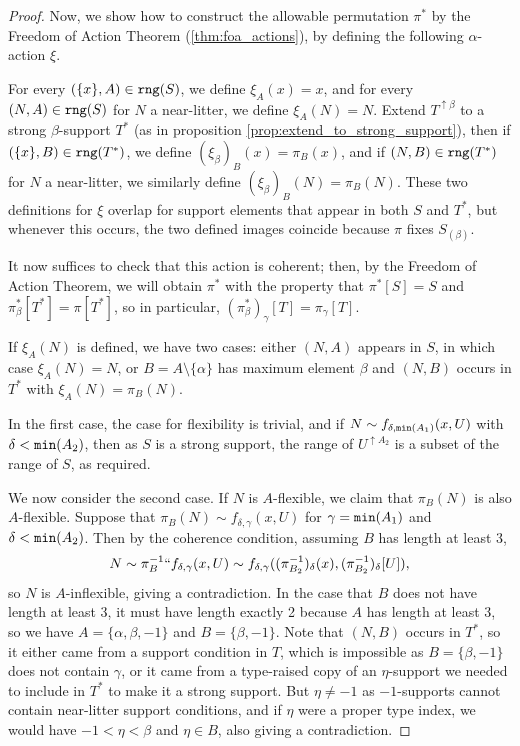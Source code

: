 \documentclass{article}
\theoremstyle{definition}
\theoremstyle{remark}
\begin{document}
{\begin{proof}
Now, we show how to construct the allowable permutation $\pi^*$ by the Freedom of Action Theorem (\ref{thm:foa_actions}), by defining the following $\alpha$-action $\xi$.

For every $(\{x\},A) \in {\tt rng}(S)$, we define $\xi_A(x) = x$, and for every $(N,A) \in {\tt rng}(S)$ for $N$ a near-litter, we define $\xi_A(N) = N$.
Extend $T^{\uparrow\beta}$ to a strong $\beta$-support $T^*$ {(as in proposition \ref{prop:extend_to_strong_support})}, then if $(\{x\},B) \in {\tt rng}(T^*)$, we define $(\xi_\beta)_B(x) = \pi_B(x)$, and if $(N,B) \in {\tt rng}(T^*)$ for $N$ a near-litter, we similarly define $(\xi_\beta)_B(N) = \pi_B(N)$.
These two definitions for $\xi$ overlap for support elements that appear in both $S$ and $T^*$, but whenever this occurs, the two defined images coincide because $\pi$ fixes $S_{(\beta)}$.

It now suffices to check that this action is coherent; then, by the Freedom of Action Theorem, we will obtain $\pi^*$ with the property that $\pi^*[S] = S$ and $\pi^*_\beta[T^*] = \pi[T^*]$, so in particular, $(\pi^*_\beta)_\gamma[T] = \pi_\gamma[T]$.

If $\xi_A(N)$ is defined, we have two cases: either $(N,A)$ appears in $S$, in which case $\xi_A(N) = N$, or $B = A\setminus\{\alpha\}$ has maximum element $\beta$ and $(N,B)$ occurs in $T^*$ with $\xi_A(N) = \pi_B(N)$.

In the first case, the case for flexibility is trivial, and if $N \sim f_{\delta,{\tt min}(A_1)}(x,U)$ with $\delta < {\tt min}(A_2)$, then as $S$ is a strong support, the range of $U^{\uparrow A_2}$ is a subset of the range of $S$, as required.

We now consider the second case.
If $N$ is $A$-flexible, we claim that $\pi_B(N)$ is also $A$-flexible.
Suppose that $\pi_B(N) \sim f_{\delta,\gamma}(x, U)$ for $\gamma = {\tt min}(A_1)$ and $\delta < {\tt min}(A_2)$.
Then by the coherence condition, assuming $B$ has length at least 3,
$$ N \sim \pi_B^{-1}``f_{\delta,\gamma}(x, U) \sim f_{\delta,\gamma}((\pi_{B_2}^{-1})_\delta(x), (\pi_{B_2}^{-1})_\delta[U]), $$
so $N$ is $A$-inflexible, giving a contradiction.
In the case that $B$ does not have length at least 3, it must have length exactly 2 because $A$ has length at least 3, so we have $A = \{ \alpha, \beta, -1 \}$ and $B = \{ \beta, -1 \}$.
Note that $(N, B)$ occurs in $T^*$, so it either came from a support condition in $T$, which is impossible as $B = \{ \beta, -1 \}$ does not contain $\gamma$, or it came from a type-raised copy of an $\eta$-support we needed to include in $T^*$ to make it a strong support.
But $\eta \neq -1$ as $-1$-supports cannot contain near-litter support conditions, and if $\eta$ were a proper type index, we would have $-1 < \eta < \beta$ and $\eta \in B$, also giving a contradiction.


\end{proof}}
\end{document}
